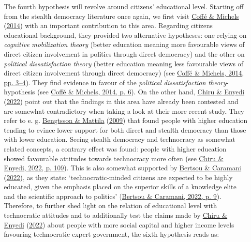 \documentclass[
  12pt,
  english,
]{article}
\begin{document}
The fourth hypothesis will revolve around citizens' educational level.
Starting off from the stealth democracy literature once again, we first
visit \protect\hyperlink{ref-coffe2014education}{Coffé \& Michels}
(\protect\hyperlink{ref-coffe2014education}{2014}) with an important
contribution to this area. Regarding citizens educational background,
they provided two alternative hypotheses: one relying on \emph{cognitive
mobilization theory} (better education meaning more favourable views of
direct citizen involvement in politics through direct democracy) and the
other on \emph{political dissatisfaction theory} (better education
meaning less favourable views of direct citizen involvement through
direct democracy) (see \protect\hyperlink{ref-coffe2014education}{Coffé
\& Michels, 2014, pp. 3--4}). They find evidence in favour of the
\emph{political dissatisfaction theory}-hypothesis (see
\protect\hyperlink{ref-coffe2014education}{Coffé \& Michels, 2014, p.
6}). On the other hand, \protect\hyperlink{ref-chiru2022wants}{Chiru \&
Enyedi} (\protect\hyperlink{ref-chiru2022wants}{2022}) point out that
the findings in this area have already been contested and are somewhat
contradictory when taking a look at their more recent study. They refer
to e. g. \protect\hyperlink{ref-bengtsson2009direct}{Bengtsson \&
Mattila} (\protect\hyperlink{ref-bengtsson2009direct}{2009}) that found
people with higher education tending to evince lower support for both
direct and stealth democracy than those with lower education. Seeing
stealth democracy and technocracy as somewhat related concepts, a
contrary effect was found: people with higher education showed
favourable attitudes towards technocracy more often (see
\protect\hyperlink{ref-chiru2022wants}{Chiru \& Enyedi, 2022, p. 109}).
This is also somewhat supported by
\protect\hyperlink{ref-bertsou2022people}{Bertsou \& Caramani}
(\protect\hyperlink{ref-bertsou2022people}{2022}), as they state:
`technocratic-minded citizens are expected to be highly educated, given
the emphasis placed on the superior skills of a knowledge elite and the
scientific approach to politics'
(\protect\hyperlink{ref-bertsou2022people}{Bertsou \& Caramani, 2022, p.
9}). Therefore, to further shed light on the relation of educational
level with technocratic attitudes and to additionally test the claims
made by \protect\hyperlink{ref-chiru2022wants}{Chiru \& Enyedi}
(\protect\hyperlink{ref-chiru2022wants}{2022}) about people with more
social capital and higher income levels favouring technocratic expert
government, the sixth hypothesis reads as:
\end{document}
